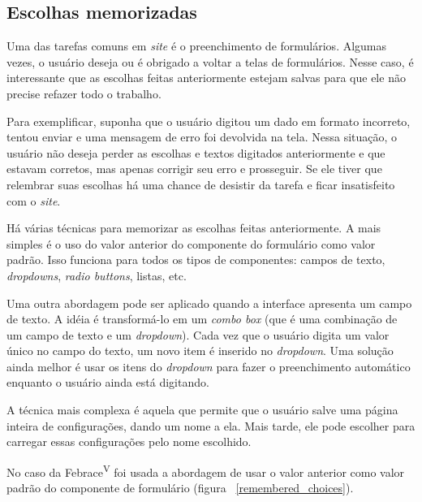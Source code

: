 \subsection{Escolhas memorizadas}

Uma das tarefas comuns em \textit{site} é o preenchimento de formulários. Algumas vezes, o usuário deseja ou é obrigado a voltar a telas de formulários. Nesse caso, é interessante que as escolhas feitas anteriormente estejam salvas para que ele não precise refazer todo o trabalho. 

Para exemplificar, suponha que o usuário digitou um dado em formato incorreto, tentou enviar e uma mensagem de erro foi devolvida na tela. Nessa situação, o usuário não deseja perder as escolhas e textos digitados anteriormente e que estavam corretos, mas apenas corrigir seu erro e prosseguir. Se ele tiver que relembrar suas escolhas há uma chance de desistir da tarefa e ficar insatisfeito com o \textit{site}.

Há várias técnicas para memorizar as escolhas feitas anteriormente. A mais simples é o uso do valor anterior do componente do formulário como valor padrão. Isso funciona para todos os tipos de componentes: campos de texto, \textit{dropdowns}, \textit{radio buttons}, listas, etc.

Uma outra abordagem pode ser aplicado quando a interface apresenta um campo de texto. A idéia é transformá-lo em um \textit{combo box} (que é uma combinação de um campo de texto e um \textit{dropdown}). Cada vez que o usuário digita um valor único no campo do texto, um novo item é inserido no \textit{dropdown}. Uma solução ainda melhor é usar os itens do \textit{dropdown} para fazer o preenchimento automático enquanto o usuário ainda está digitando.

A técnica mais complexa é aquela que permite que o usuário salve uma página inteira de configurações, dando um nome a ela. Mais tarde, ele pode escolher para carregar essas configurações pelo nome escolhido.

No caso da Febrace\textsuperscript{V} foi usada a abordagem de usar o valor anterior como valor padrão do componente de formulário (figura ~\ref{remembered_choices}).

